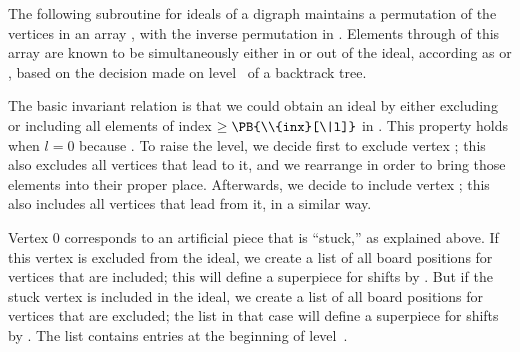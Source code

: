 The following subroutine for ideals of a digraph maintains
a permutation
of the vertices in an array , with the inverse permutation in .
Elements  through  of this
array are known to be
simultaneously either in or out of the ideal, according as 
or , based on the decision
made on level~ of a backtrack tree.

The basic invariant relation is that we could obtain an ideal by either
excluding or including all elements of index $\ge\PB{\\{inx}[\|l]}$ in .
This property holds
when $l=0$ because . To raise the level, we decide
first to
exclude vertex ; this also excludes all vertices
that lead to it, and we rearrange  in order to bring those
elements into their proper place. Afterwards, we decide to include
vertex ; this also includes all vertices that lead
from it,
in a similar way.

Vertex 0 corresponds to an artificial piece that is ``stuck,'' as
explained above. If this vertex is excluded from the ideal, we create a list
of all board positions for vertices that are included; this
will define a superpiece for shifts by . But if the stuck vertex is
included in the ideal, we create a list of all board positions for vertices
that are excluded; the list in that case will define a superpiece for shifts
by . The list contains  entries at the
beginning of level~.

